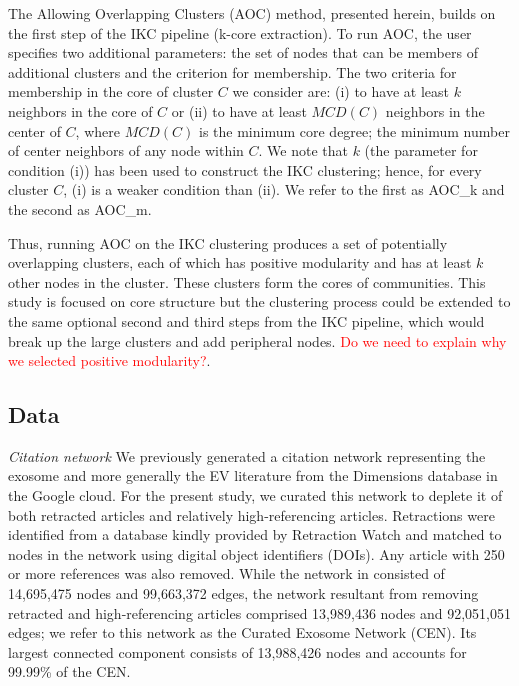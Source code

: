\documentclass[12pt, oneside]{article}   	%
\begin{document}
The Allowing Overlapping Clusters (AOC) method, presented herein, builds on the first step of the IKC pipeline (k-core extraction). To run AOC, the user specifies two additional parameters:  
the set of nodes that can be members of  additional clusters and the criterion for membership.  The two criteria for membership in the core of cluster $C$ we consider are: (i) to have at least $k$ neighbors 
in the core of $C$ or (ii) to have at least $MCD(C)$ neighbors in the center of $C$, where $MCD(C)$ is the minimum core degree; the minimum number of center neighbors of any node within $C$. 
We note that $k$ (the parameter for condition (i)) has been used to construct the IKC clustering; hence, for every cluster $C$,  (i) is a weaker condition than (ii).
We refer to the first as AOC\_k and the second as AOC\_m.

Thus, running   AOC on the IKC clustering produces a set of potentially overlapping clusters, each of which has positive modularity and has at least $k$ other nodes in the cluster. These clusters form the cores of communities.  This study is focused on core structure but the clustering process could be extended to the same optional second and third steps from the IKC pipeline, which would break up the large clusters and add peripheral nodes. \textcolor{red}{Do we need to explain why we selected positive modularity?}.

\subsection{Data} 
\emph{Citation network} We previously generated a citation network \citep{Wedell2022} representing the exosome \citep{harding1983} and more generally the EV literature \citep{raposo2021} from the Dimensions database \citep{hook2018dimensions} in the Google cloud. For the present study, we curated this network to deplete it of both retracted articles and relatively high-referencing articles. 
Retractions were identified from a database kindly provided by Retraction Watch and matched to nodes in the network using digital object identifiers (DOIs). Any article with 250 or more references was also removed. 
While the network in \cite{Wedell2022} consisted of 14,695,475 nodes and 99,663,372 edges, the network resultant from removing retracted and high-referencing articles comprised 13,989,436 nodes and 92,051,051 edges; we refer to this network as the Curated Exosome Network (CEN). Its largest connected component consists of 13,988,426 nodes and accounts for 99.99\% of the CEN.
\end{document}

